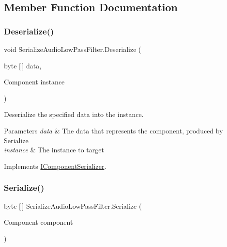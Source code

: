 \subsection{Member Function Documentation}
\mbox{\label{class_serialize_audio_low_pass_filter_a041864b6e0b1f1a8bab893b5243ad880}} 
\subsubsection{\texorpdfstring{Deserialize()}{Deserialize()}}
{\footnotesize\ttfamily void Serialize\+Audio\+Low\+Pass\+Filter.\+Deserialize (\begin{DoxyParamCaption}\item[{byte \mbox{[}$\,$\mbox{]}}]{data,  }\item[{Component}]{instance }\end{DoxyParamCaption})\hspace{0.3cm}{\ttfamily [inline]}}



Deserialize the specified data into the instance. 


\begin{DoxyParams}{Parameters}
{\em data} & The data that represents the component, produced by Serialize \\
\hline
{\em instance} & The instance to target \\
\hline
\end{DoxyParams}


Implements \hyperlink{interface_i_component_serializer_a4cc366a5c78b33d47a90c209d8fed883}{I\+Component\+Serializer}.

\mbox{\label{class_serialize_audio_low_pass_filter_a3c3f8b730af67936ec7ddc4f318bd1c0}} 
\subsubsection{\texorpdfstring{Serialize()}{Serialize()}}
{\footnotesize\ttfamily byte \mbox{[}$\,$\mbox{]} Serialize\+Audio\+Low\+Pass\+Filter.\+Serialize (\begin{DoxyParamCaption}\item[{Component}]{component }\end{DoxyParamCaption})\hspace{0.3cm}{\ttfamily [inline]}}



